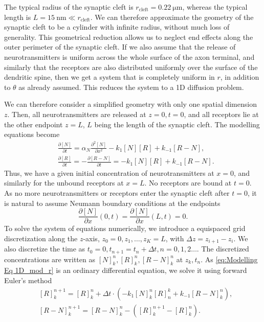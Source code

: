 \documentclass{article}
\begin{document}
The typical radius of the synaptic cleft is $r_{\text{cleft}}=\SI{0.22}{\micro \meter}$, whereas the typical length is $L = \SI{15}{\nano \meter} \ll r_{\text{cleft}}$. We can therefore approximate the geometry of the synaptic cleft to be a cylinder with infinite radius, without much loss of generality. This geometrical reduction allows us to neglect end effects along the outer perimeter of the synaptic cleft. If we also assume that the release of neurotransmitters is uniform across the whole surface of the axon terminal, and similarly that the receptors are also distributed uniformly over the surface of the dendritic spine, then we get a system that is completely uniform in $r$, in addition to $\theta$ as already assumed. This reduces the system to a 1D diffusion problem.

We can therefore consider a simplified geometry with only one spatial dimension $z$.
Then, all neurotransmitters are released at $z = 0, t = 0$, and all receptors lie at the other endpoint $z = L$, $L$ being the length of the synaptic cleft.
The modelling equations become 
\begin{align}\label{eq:Modelling Eq 1D_mod_n}
        & \frac{\partial [N]}{\partial t} = \alpha_N \frac{\partial^2 [N]}{\partial x^2} - k_1 [N][R] + k_{-1}[R-N], \\
        \label{eq:Modelling Eq 1D_mod_r}
        &\frac{\partial [R]}{\partial t} = -\frac{\partial[R-N]}{\partial t} = -k_1 [N][R] + k_{-1}[R-N].
\end{align}
Thus, we have a given initial concentration of neurotransmitters at $x = 0$, and similarly for the unbound receptors at $x = L$.
No receptors are bound at $t = 0$.
As no more neurotransmitters or receptors enter the synaptic cleft after $t = 0$, it is natural to assume Neumann boundary conditions at the endpoints
\begin{equation}\label{eq:boundary}
        \frac{\partial [N]}{\partial x}(0, t) = \frac{\partial [N]}{\partial x} (L, t) = 0. 
\end{equation}
To solve the system of equations numerically, we introduce a equispaced grid discretization along the $z$-axis, $z_0 = 0, z_1, \hdots, z_K = L$, with $\Delta z = z_{i + 1} - z_i$.
We also discretize the time as $t_0 = 0, t_{n +1} = t_n + \Delta t, n = 0, 1, 2 \hdots$.
The discretized concentrations are written as $[N]_{k}^{n}, [R]_k^n, [R-N]_k^n$ at $z_k, t_n$.
As \eqref{eq:Modelling Eq 1D_mod_r} is an ordinary differential equation, we solve it using forward Euler's method
\begin{align*}
        &[R]_k^{n+1} = [R]_k^n + \Delta t \cdot (-k_1[N]_k^n[R]_n^k + k_{-1}[R-N]_k^n), \\
        &[R - N]_k^{n+1} = [R-N]_k^n -([R]_{k}^{n+1} - [R]_k^n).
\end{align*}
\end{document}
